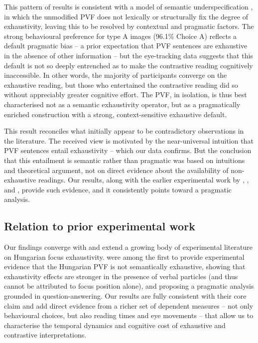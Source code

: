 \documentclass[a4paper, ruler]{CUP-JNL-LIN}%
\begin{document}
This pattern of results is consistent with a model of semantic underspecification \citep[cf.][]{wedgwood_2006_hungarian}, in which the unmodified PVF does not lexically or structurally fix the degree of exhaustivity, leaving this to be resolved by contextual and pragmatic factors. The strong behavioural preference for type A images (96.1\% Choice A) reflects a default pragmatic bias -- a prior expectation that PVF sentences are exhaustive in the absence of other information -- but the eye-tracking data suggests that this default is not so deeply entrenched as to make the contrastive reading cognitively inaccessible. In other words, the majority of participants converge on the exhaustive reading, but those who entertained the contrastive reading did so without appreciably greater cognitive effort. The PVF, in isolation, is thus best characterised not as a semantic exhaustivity operator, but as a pragmatically enriched construction with a strong, context-sensitive exhaustive default.

This result reconciles what initially appear to be contradictory observations in the literature. The received view \citep{szabolcsi_1981_compositionality,ekiss_1998_identificational,kenesei_2006_focus,horvath_2008_separating} is motivated by the near-universal intuition that PVF sentences entail exhaustivity -- which our data confirms. But the conclusion that this entailment is semantic rather than pragmatic was based on intuitions and theoretical argument, not on direct evidence about the availability of non-exhaustive readings. Our results, along with the earlier experimental work by \citet{onea_2009_hungarian}, \citet{gerocs_2014_exhaustivity}, and \citet{kaldi_2018_linguistic}, provide such evidence, and it consistently points toward a pragmatic analysis.



\subsection{Relation to prior experimental work}

Our findings converge with and extend a growing body of experimental literature on Hungarian focus exhaustivity. \citet{onea_2009_hungarian} were among the first to provide experimental evidence that the Hungarian PVF is not semantically exhaustive, showing that exhaustivity effects are stronger in the presence of verbal particles (and thus cannot be attributed to focus position alone), and proposing a pragmatic analysis grounded in question-answering. Our results are fully consistent with their core claim and add direct evidence from a richer set of dependent measures -- not only behavioural choices, but also reading times and eye movements -- that allow us to characterise the temporal dynamics and cognitive cost of exhaustive and contrastive interpretations.
\end{document}
